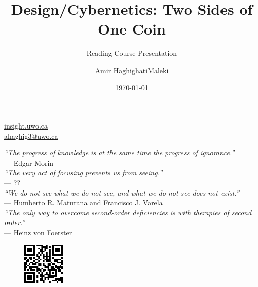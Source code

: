 \documentclass[
	11pt,
	aspectratio=169,
]{beamer}
\begin{document}
	\author{Amir HaghighatiMaleki}
	\title{Design/Cybernetics: Two Sides of One Coin}
	\subtitle{Reading Course Presentation}
	\date{\today}
	\subject{Reading Course Presentation}
	\begin{frame}
		\maketitle
		\centering\tiny\hyperlink{http://insight.uwo.ca}{insight.uwo.ca}\\
		\centering\tiny\hyperlink{mailto:ahaghig3@uwo.ca}{ahaghig3@uwo.ca}
	\end{frame}

\begin{frame}
	\textit{\rm``The progress of knowledge is at the same time the progress of ignorance.''}\\
	--- Edgar Morin \cite{morin_1992} \\
	\vspace{0.4cm}
	\textit{\rm``The very act of focusing prevents us from seeing.''}\\
	--- ?? \\
	\vspace{0.4cm}
	\textit{\rm``We do not see what we do not see, and what we do not see does not exist.''}\\
	--- Humberto R. Maturana and Francisco J. Varela \cite{maturana_varela_1987}\\
	\vspace{0.4cm}
	\textit{\rm``The only way to overcome second-order deficiencies is with therapies of second order.''}\\
	--- Heinz von Foerster \cite{vonFoerster_2003}\\
	\vspace{0.4cm}
	\begin{figure}
		\centering
		\href{https://anewage.github.io}{
			\includegraphics[width=2cm]{resources/anewage_github_io.png}
		}
	\end{figure}
\end{frame}
\end{document}
